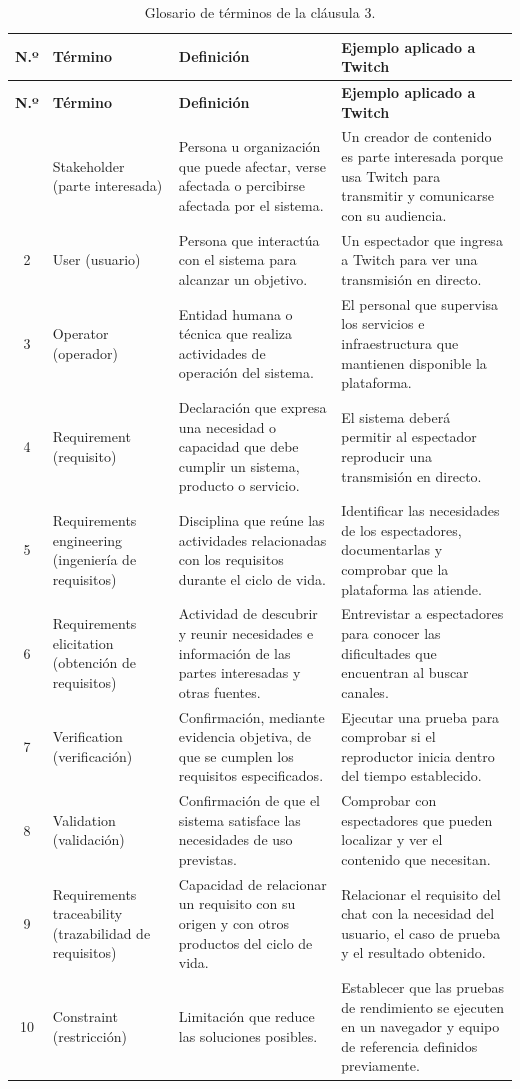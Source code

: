 \documentclass[10pt,a4paper]{article}
\begin{document}
{\footnotesize
\setlength{\tabcolsep}{3pt}
\begin{longtable}{@{}c P{2.5cm} P{5.6cm} P{6.6cm}@{}}
\caption{Glosario de términos de la cláusula 3.}\label{tab:glosario}\\
\toprule
\textbf{N.º} & \textbf{Término} & \textbf{Definición} & \textbf{Ejemplo aplicado a Twitch}\\
\midrule
\endfirsthead
\toprule
\textbf{N.º} & \textbf{Término} & \textbf{Definición} & \textbf{Ejemplo aplicado a Twitch}\\
\midrule
\endhead
\bottomrule
{} & Stakeholder (parte interesada) & Persona u organización que puede afectar, verse afectada o percibirse afectada por el sistema. & Un creador de contenido es parte interesada porque usa Twitch para transmitir y comunicarse con su audiencia.\\
2 & User (usuario) & Persona que interactúa con el sistema para alcanzar un objetivo. & Un espectador que ingresa a Twitch para ver una transmisión en directo.\\
3 & Operator (operador) & Entidad humana o técnica que realiza actividades de operación del sistema. & El personal que supervisa los servicios e infraestructura que mantienen disponible la plataforma.\\
4 & Requirement (requisito) & Declaración que expresa una necesidad o capacidad que debe cumplir un sistema, producto o servicio. & El sistema deberá permitir al espectador reproducir una transmisión en directo.\\
5 & Requirements engineering (ingeniería de requisitos) & Disciplina que reúne las actividades relacionadas con los requisitos durante el ciclo de vida. & Identificar las necesidades de los espectadores, documentarlas y comprobar que la plataforma las atiende.\\
6 & Requirements elicitation (obtención de requisitos) & Actividad de descubrir y reunir necesidades e información de las partes interesadas y otras fuentes. & Entrevistar a espectadores para conocer las dificultades que encuentran al buscar canales.\\
7 & Verification (verificación) & Confirmación, mediante evidencia objetiva, de que se cumplen los requisitos especificados. & Ejecutar una prueba para comprobar si el reproductor inicia dentro del tiempo establecido.\\
8 & Validation (validación) & Confirmación de que el sistema satisface las necesidades de uso previstas. & Comprobar con espectadores que pueden localizar y ver el contenido que necesitan.\\
9 & Requirements traceability (trazabilidad de requisitos) & Capacidad de relacionar un requisito con su origen y con otros productos del ciclo de vida. & Relacionar el requisito del chat con la necesidad del usuario, el caso de prueba y el resultado obtenido.\\
10 & Constraint (restricción) & Limitación que reduce las soluciones posibles. & Establecer que las pruebas de rendimiento se ejecuten en un navegador y equipo de referencia definidos previamente.\\
\end{longtable}
}
\end{document}

